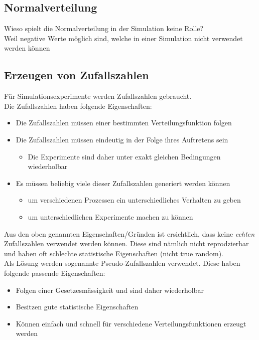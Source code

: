 \subsection{Normalverteilung}
Wieso spielt die Normalverteilung in der Simulation keine Rolle?
\\
Weil negative Werte möglich sind, welche in einer Simulation nicht verwendet werden können
\subsection{Erzeugen von Zufallszahlen}
Für Simulationsexperimente werden Zufallszahlen gebraucht. 
\\
Die Zufallszahlen haben folgende Eigenschaften:
\begin{itemize}
    \item Die Zufallszahlen müssen einer bestimmten Verteilungsfunktion folgen
    \item Die Zufallszahlen müssen eindeutig in der Folge ihres Auftretens sein
    \begin{itemize}
        \item Die Experimente sind daher unter exakt gleichen Bedingungen wiederholbar
    \end{itemize}
    \item Es müssen beliebig viele dieser Zufallszahlen generiert werden können
    \begin{itemize}
        \item um verschiedenen Prozessen ein unterschiedliches Verhalten zu geben
        \item um unterschiedlichen Experimente machen zu können
    \end{itemize}
\end{itemize}

Aus den oben genannten Eigenschaften/Gründen ist ersichtlich, dass keine \textit{echten} Zufallszahlen verwendet werden können. Diese sind nämlich nicht reprodzierbar und haben oft schlechte statistische Eigenschaften (nicht true random).
\\
Als Lösung werden sogenannte Pseudo-Zufallszahlen verwendet. Diese haben folgende passende Eigenschaften:
\begin{itemize}
    \item Folgen einer Gesetzesmässigkeit und sind daher wiederholbar
    \item Besitzen gute statistische Eigenschaften
    \item Können einfach und schnell für verschiedene Verteilungsfunktionen erzeugt werden
\end{itemize}

